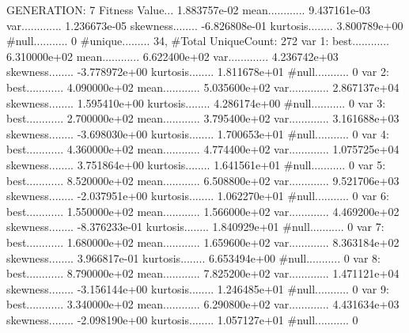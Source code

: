 \documentclass[oneside,letterpaper,titlepage]{article}
\begin{document}
\begin{Schunk}
\begin{Soutput}
GENERATION: 7
Fitness Value... 1.883757e-02
mean............ 9.437161e-03
var............. 1.236673e-05
skewness........ -6.826808e-01
kurtosis........ 3.800789e+00
#null........... 0
#unique......... 34, #Total UniqueCount: 272
var 1:
best............ 6.310000e+02
mean............ 6.622400e+02
var............. 4.236742e+03
skewness........ -3.778972e+00
kurtosis........ 1.811678e+01
#null........... 0
var 2:
best............ 4.090000e+02
mean............ 5.035600e+02
var............. 2.867137e+04
skewness........ 1.595410e+00
kurtosis........ 4.286174e+00
#null........... 0
var 3:
best............ 2.700000e+02
mean............ 3.795400e+02
var............. 3.161688e+03
skewness........ -3.698030e+00
kurtosis........ 1.700653e+01
#null........... 0
var 4:
best............ 4.360000e+02
mean............ 4.774400e+02
var............. 1.075725e+04
skewness........ 3.751864e+00
kurtosis........ 1.641561e+01
#null........... 0
var 5:
best............ 8.520000e+02
mean............ 6.508800e+02
var............. 9.521706e+03
skewness........ -2.037951e+00
kurtosis........ 1.062270e+01
#null........... 0
var 6:
best............ 1.550000e+02
mean............ 1.566000e+02
var............. 4.469200e+02
skewness........ -8.376233e-01
kurtosis........ 1.840929e+01
#null........... 0
var 7:
best............ 1.680000e+02
mean............ 1.659600e+02
var............. 8.363184e+02
skewness........ 3.966817e-01
kurtosis........ 6.653494e+00
#null........... 0
var 8:
best............ 8.790000e+02
mean............ 7.825200e+02
var............. 1.471121e+04
skewness........ -3.156144e+00
kurtosis........ 1.246485e+01
#null........... 0
var 9:
best............ 3.340000e+02
mean............ 6.290800e+02
var............. 4.431634e+03
skewness........ -2.098190e+00
kurtosis........ 1.057127e+01
#null........... 0


\end{Soutput}
\end{Schunk}
\end{document}
